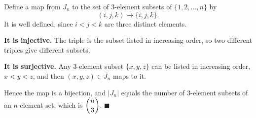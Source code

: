 Define a map from $J_n$ to the set of $3$-element subsets of $\{1,2,\dots,n\}$ by
\[
(i,j,k)\longmapsto\{i,j,k\}.
\]
It is well defined, since $i<j<k$ are three distinct elements.

\textbf{It is injective.} The triple is the subset listed in increasing order, so two different triples give different subsets.

\textbf{It is surjective.} Any $3$-element subset $\{x,y,z\}$ can be listed in increasing order, $x<y<z$, and then $(x,y,z)\in J_n$ maps to it.

Hence the map is a bijection, and $|J_n|$ equals the number of $3$-element subsets of an $n$-element set, which is $\dbinom n3$. $\blacksquare$
